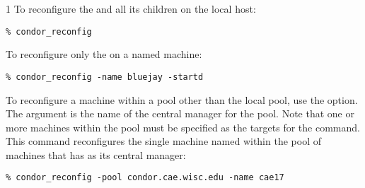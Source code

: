 \begin{ManPage}{\label{man-condor-reconfig}}{1}
\Examples
To reconfigure the  and all its children
on the local host:
\begin{verbatim}
% condor_reconfig
\end{verbatim}

To reconfigure only the  on a named machine:
\begin{verbatim}
% condor_reconfig -name bluejay -startd
\end{verbatim}

To reconfigure a machine within a pool
other than the local pool, use the  option.
The argument is the name of the central manager for the pool.
Note that one or more machines within the pool must be
specified as the targets for the command.
This command reconfigures
the single machine named  within the
pool of machines that has  as
its central manager:
\begin{verbatim}
% condor_reconfig -pool condor.cae.wisc.edu -name cae17
\end{verbatim}

\end{ManPage}
